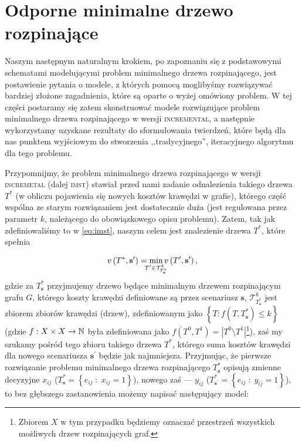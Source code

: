 \section{Odporne minimalne drzewo rozpinające}

Naszym następnym naturalnym krokiem, po zapoznaniu się z podstawowymi schematami modelującymi problem minimalnego drzewa rozpinającego, jest postawienie pytania o modele, z których pomocą moglibyśmy rozwiązywać bardziej złożone zagadnienia, które są oparte o wyżej omówiony problem. W tej części postaramy się zatem skonstruować modele rozwiązujące problem minimalnego drzewa rozpinającego w wersji \textsc{incremental}, a następnie wykorzystamy uzyskane rezultaty do sformułowania twierdzeń, które będą dla nas punktem wyjściowym do stworzenia ,,tradycyjnego'', iteracyjnego algorytmu dla tego problemu.

Przypomnijmy, że problem minimalnego drzewa rozpinającego w wersji \textsc{incremetal} (dalej \textsc{imst}) stawiał przed nami zadanie odnalezienia takiego drzewa $T^{\ast}$ (w obliczu pojawienia się nowych kosztów krawędzi w grafie), którego część wspólna ze starym rozwiązaniem jest dostatecznie duża (jest regulowana przez parametr $k$, należącego do obowiązkowego opisu problemu). Zatem, tak jak zdefiniowaliśmy to w \ref{eq:imst}, naszym celem jest znalezienie drzewa $T^{\ast}$, które spełnia

\begin{equation}
	v \left( T^{\ast}, \textbf{s}^{\prime} \right) = \min_{\mathclap{T^{\prime} \in \mathcal{T}^{k}_{T^{\ast}_{\textbf{s}}}}} v \left( T^{\prime}, \textbf{s}^{\prime} \right)\text{,}
\end{equation}
gdzie za $T^{\ast}_{\textbf{s}}$ przyjmujemy drzewo będące minimalnym drzewem rozpinającym grafu $G$, którego koszty krawędzi definiowane są przez scenariusz $\textbf{s}$, $\mathcal{T}^{k}_{T^{\ast}_{\textbf{s}}}$ jest zbiorem zbiorów krawędzi (drzew), zdefiniowanym jako $\left\{ T : f \left( T, T^{\ast}_{\textbf{s}} \right) \leqslant k \right\}$ (gdzie $f: X \times X \rightarrow \mathbb{N}$ była zdefiniowana jako $f \left( T^{0}, T^{1} \right) = \left| T^{0} \setminus T^{1} \right|$\footnote{Zbiorem $X$ w tym przypadku będziemy oznaczać przestrzeń wszystkich możliwych drzew rozpinających graf.}), zaś my szukamy pośród tego zbioru takiego drzewa $T^{\ast}$, którego suma kosztów krawędzi dla nowego scenariusza $\textbf{s}^{\prime}$ będzie jak najmniejsza. Przyjmując, że pierwsze rozwiązanie problemu minimalnego drzewa rozpinającego $T^{\ast}_{\textbf{s}}$ opisują zmienne decyzyjne $x_{ij}$ ($T^{\ast}_{\textbf{s}} = \left\{ e_{ij} \; : \; x_{ij} = 1 \right\}$), nowego zaś --- $y_{ij}$ ($T^{\ast}_{\textbf{s}^{\prime}} = \left\{ e_{ij} \; : \; y_{ij} = 1 \right\}$), to bez głębszego zastanowienia możemy napisać następujący model:

